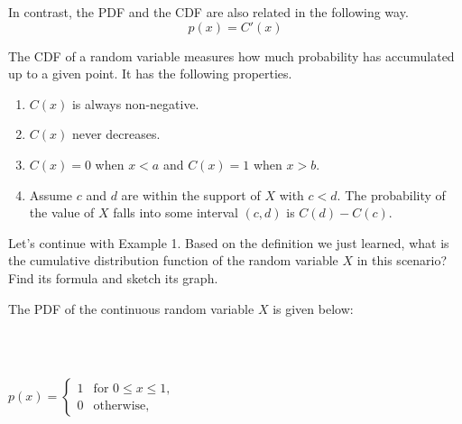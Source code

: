 \documentclass[10pt]{article}
\begin{document}
In contrast, the PDF and the CDF are also related in the following way. \[p(x)=C'(x)\]

The CDF of a random variable measures how much probability has accumulated up to a given point. It has the following properties.
\begin{enumerate}
    \item $C(x)$ is always non-negative.
    \item $C(x)$ never decreases.
    \item $C(x)=0$ when $x<a$ and $C(x)=1$ when $x>b$.
    \item Assume $c$ and $d$ are within the support of $X$ with $c<d$. The probability of the value of $X$ falls into some interval $(c, d)$ is $C(d)-C(c)$.
\end{enumerate}



 Let's continue with Example 1. Based on the definition we just learned, what is the cumulative distribution function of the random variable $X$ in this scenario? Find its formula and sketch its graph.

\vfill

The PDF of the continuous random variable $X$ is given below:\\

\

\,\hfill
%
\begin{minipage}[t][0.5in]{0.25\textwidth}
$
p(x) = 
\begin{cases} 
1 & \text{for } 0 \leq x \leq 1, \\
0 & \text{otherwise},
\end{cases}
$
\end{minipage}
%
\hfill
%
\begin{minipage}[t][0.5in]{0.25\textwidth}
\,\\[-0.5in]
\end{minipage}
%
\hfill\,\\
\end{document}
